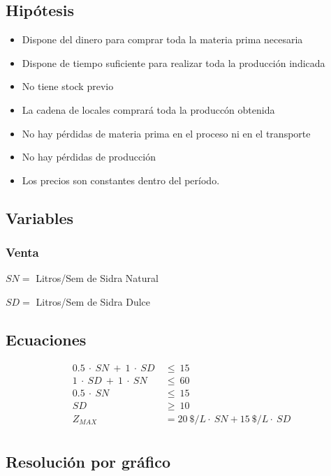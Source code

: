 \documentclass[a4paper,10pt]{article}
\begin{document}
\subsection{Hip\'otesis}
\begin{itemize}
  \item{Dispone del dinero para comprar toda la materia prima necesaria}
 \item{Dispone de tiempo suficiente para realizar toda la producci\'on indicada}
 \item{No tiene stock previo}
 \item{La cadena de locales comprar\'a toda la producc\'on obtenida}
 \item{No hay p\'erdidas de materia prima en el proceso ni en el transporte}
 \item{No hay p\'erdidas de producci\'on}
 \item{Los precios son constantes dentro del per\'iodo.}
\end{itemize}
 
\subsection{Variables}

 \subsubsection{Venta}
\vspace{2mm}
 $ SN = $ Litros/Sem de Sidra Natural
 
 $ SD = $ Litros/Sem de Sidra Dulce
 \vspace{2mm}
 
\subsection{Ecuaciones}

\begin{align*}
0.5\ \cdot \ SN\ + \ 1\ \cdot \ SD \ &\leq \ 15  \\
1\ \cdot \  SD\ +\ 1\ \cdot \ SN \ &\leq \ 60  \\
 0.5\ \cdot \ SN\ &\leq \ 15  \\
 SD \ &\geq\ 10  \\
 Z_{MAX} &= 20 \ \$/L \cdot \ SN + 15 \ \$/L \cdot \ SD \\
\end{align*}

\subsection{Resoluci\'on por gr\'afico}
\end{document}
